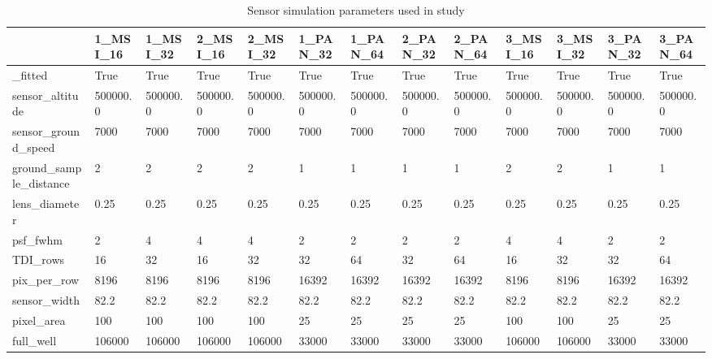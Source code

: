 \begin{table}
\centering
\caption{Sensor simulation parameters used in study}
\label{tab:sim_params}
\begin{tabular}{lllllllllllll}
\toprule
{} &  1\_MSI\_16 &  1\_MSI\_32 &  2\_MSI\_16 &  2\_MSI\_32 &  1\_PAN\_32 &  1\_PAN\_64 &  2\_PAN\_32 &  2\_PAN\_64 &  3\_MSI\_16 &  3\_MSI\_32 &  3\_PAN\_32 &  3\_PAN\_64 \\
\midrule
\_fitted                &      True &      True &      True &      True &      True &      True &      True &      True &      True &      True &      True &      True \\
sensor\_altitude        &  500000.0 &  500000.0 &  500000.0 &  500000.0 &  500000.0 &  500000.0 &  500000.0 &  500000.0 &  500000.0 &  500000.0 &  500000.0 &  500000.0 \\
sensor\_ground\_speed    &      7000 &      7000 &      7000 &      7000 &      7000 &      7000 &      7000 &      7000 &      7000 &      7000 &      7000 &      7000 \\
ground\_sample\_distance &         2 &         2 &         2 &         2 &         1 &         1 &         1 &         1 &         2 &         2 &         1 &         1 \\
lens\_diameter          &      0.25 &      0.25 &      0.25 &      0.25 &      0.25 &      0.25 &      0.25 &      0.25 &      0.25 &      0.25 &      0.25 &      0.25 \\
psf\_fwhm               &         2 &         4 &         4 &         4 &         2 &         2 &         2 &         2 &         4 &         4 &         2 &         2 \\
TDI\_rows               &        16 &        32 &        16 &        32 &        32 &        64 &        32 &        64 &        16 &        32 &        32 &        64 \\
pix\_per\_row            &      8196 &      8196 &      8196 &      8196 &     16392 &     16392 &     16392 &     16392 &      8196 &      8196 &     16392 &     16392 \\
sensor\_width           &      82.2 &      82.2 &      82.2 &      82.2 &      82.2 &      82.2 &      82.2 &      82.2 &      82.2 &      82.2 &      82.2 &      82.2 \\
pixel\_area             &       100 &       100 &       100 &       100 &        25 &        25 &        25 &        25 &       100 &       100 &        25 &        25 \\
full\_well              &    106000 &    106000 &    106000 &    106000 &     33000 &     33000 &     33000 &     33000 &    106000 &    106000 &     33000 &     33000 \\

\end{tabular}
\end{table}
